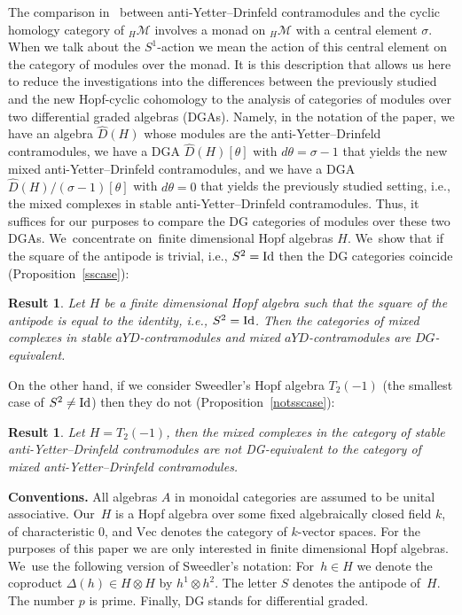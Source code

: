 \documentclass[10pt,a4paper]{amsart}
\numberwithin{equation}{section}
\newtheorem{prop}[Theorem]{Result}
 { \theoremstyle{definition}
\newtheorem{Definition}[Theorem]{Definition}
\newtheorem{Note}[Theorem]{Note}
\newtheorem{Example}[Theorem]{Example}
\newtheorem{Remark}[Theorem]{Remark} }
\newcommand{\hmod}{{_H\mathcal{M}}}
\newcommand{\vect}{\text{Vec}}
\newcommand{\ot}{\otimes}
\begin{document}
The comparison in~\cite{chern} between anti-Yetter--Drinfeld contramodules and the cyclic homology category of $\hmod$ involves a monad on $\hmod$ with a central element $\sigma$. When we talk about the $S^1$-action we mean the action of this central element on the category of modules over the monad. It is this description that allows us here to reduce the investigations into the differences between the previously studied and the new Hopf-cyclic cohomology to the analysis of categories of modules over two differential graded algebras (DGAs). Namely, in the notation of the paper, we have an algebra $\widehat{D}(H)$ whose modules are the anti-Yetter--Drinfeld contramodules, we have a DGA $\widehat{D}(H)[\theta]$ with $d\theta=\sigma-1$ that yields the new mixed anti-Yetter--Drinfeld contramodules, and we have a DGA $\widehat{D}(H)/(\sigma-1)[\theta]$ with $d\theta=0$ that yields the previously studied setting, i.e., the mixed complexes in stable anti-Yetter--Drinfeld contramodules. Thus, it suffices for our purposes to compare the DG categories of modules over these two DGAs. We~concentrate on~finite dimensional Hopf algebras $H$. We~show that if the square of the antipode is trivial, i.e., $S^2={\rm Id}$ then the DG categories coincide (Proposition~\ref{sscase}):
\begin{prop}
Let $H$ be a finite dimensional Hopf algebra such that the square of the antipode is equal to the identity, i.e., $S^2={\rm Id}$. Then the categories of mixed complexes in stable $aYD$-contramodules and mixed $aYD$-contramodules are $DG$-equivalent.
\end{prop} On the other hand, if we consider Sweedler's Hopf algebra $T_2(-1)$ (the smallest case of $S^2\neq {\rm Id}$) then they do not (Proposition~\ref{notsscase}):
\begin{prop}
Let $H=T_2(-1)$, then the mixed complexes in the category of stable anti-Yetter--Drinfeld contramodules are not DG-equivalent to the category of mixed anti-Yetter--Drinfeld contramodules.
\end{prop}

\noindent \textbf{Conventions.} All algebras $A$ in monoidal categories are assumed to be unital associative. Our~$H$ is a Hopf algebra over some fixed algebraically closed field $k$, of characteristic $0$, and $\vect$ denotes the category of $k$-vector spaces. For the purposes of this paper we are only interested in finite dimensional Hopf algebras. We~use the following version of Sweedler's notation: For~$h\in H$ we denote the coproduct $\Delta(h)\in H\ot H$ by $h^1\ot h^2$. The letter $S$ denotes the antipode of~$H$. The number $p$ is prime. Finally, DG stands for differential graded.
\end{document}
